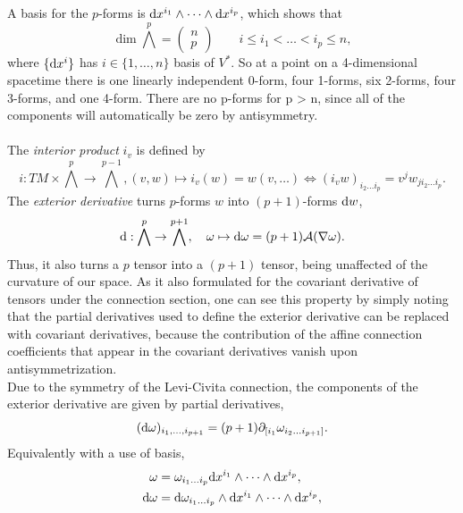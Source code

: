 A basis for the $p$-forms is $\mathrm{d} x^{i_1} \wedge \dots \wedge \mathrm{d} x^{i_p}$, which shows that
\begin{equation}
	\dim{\bigwedge^p} = 
	\begin{pmatrix}
	n\\
	p
	\end{pmatrix}\qquad 
i \leq i_1 < \dots < i_p \leq n,
\end{equation}
where $\{\mathrm{d} x^i\}$ has $i\in \{1,\dots,n\}$ basis of $V^*$. So at a point on a 4-dimensional spacetime there is one linearly independent 0-form, four
1-forms, six 2-forms, four 3-forms, and one 4-form. There are no p-forms for p > n, since all
of the components will automatically be zero by antisymmetry.\\
\\
The \emph{interior product} $i_v$ is defined by 
\begin{equation}
	i:TM\times \bigwedge^p \rightarrow \bigwedge^{p-1}, (v,w) \mapsto i_v(w) =w(v,\dots) \Leftrightarrow (i_v w)_{i_2 \dots i_p} = v^j w_{j i_2 \dots i_p}.
\end{equation}
The \emph{exterior derivative} turns $p$-forms $w$ into $(p+1)$-forms $\mathrm{d} w$,
\begin{equation}
	\mathrm{d} : \bigwedge^p \rightarrow \bigwedge^{p+1}, \quad \omega \mapsto \mathrm{d} \omega = (p+1) \mathcal{A}(\nabla \omega).
\end{equation}
Thus, it also turns a $p$ tensor into a $(p+1)$ tensor, being unaffected of the curvature of our space. As it also formulated for the covariant derivative of tensors under the connection section, one can see this property by simply noting that the partial derivatives used to define the exterior derivative can be replaced with covariant derivatives, because the contribution of the affine connection coefficients that appear in the covariant derivatives vanish upon antisymmetrization.\\
Due to the symmetry of the Levi-Civita connection, the components of the exterior derivative are given by partial derivatives,
\begin{equation}
	(\mathrm{d} \omega)_{i_1,\dots,i_{p+1}} = (p+1) \partial_{[i_1} \omega_{i_2 \dots i_{p+1}]}.
\end{equation}
Equivalently with a use of basis,
\begin{align}
	\omega &= \omega_{i_1 \dots i_p} \mathrm{d} x^{i_1} \wedge \dots \wedge \mathrm{d} x^{i_p}, \\
	\mathrm{d} \omega &= \mathrm{d} \omega_{i_1 \dots i_p} \wedge \mathrm{d} x^{i_1} \wedge \dots \wedge \mathrm{d} x^{i_p},
\end{align}
